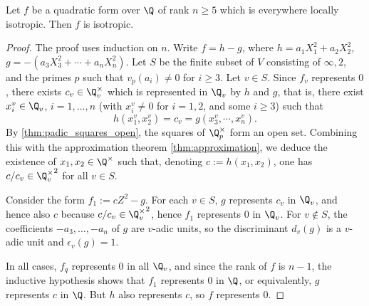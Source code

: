 \begin{lemma}\label{lem:isotr_of_five_le_rk}
\leanok
Let $f$ be a quadratic form over $\Q$ of rank $n \ge 5$ which is everywhere locally isotropic. Then $f$ is isotropic.
\end{lemma}
\begin{proof}
The proof uses induction on $n$. Write $f = h - g$, where $h = a_1X_1^2 + a_2X_2^2$, $g = -(a_3X_3^2 + \cdots + a_nX_n^2)$.
Let $S$ be the finite subset of $V$ consisting of $\infty, 2$, and the primes $p$ such that $v_p(a_i) \ne 0$ for $i \ge 3$.
Let $v \in S$. Since $f_v$ represents $0$, there exists $c_v \in \Q_v^\times$ which is represented in $\Q_v$ by $h$ and $g$, that is, there exist $x_i^v \in \Q_v$, $i=1, \dots, n$ (with $x_i^v \ne 0$ for $i=1, 2$, and some $i \ge 3$) such that 
\[ h(x_1^v, x_2^v) = c_v = g(x_3^v, \cdots, x_n^v).\]
By \ref{thm:padic_squares_open}, the squares of $\Q_p^\times$ form an open set. Combining this with the approximation theorem \ref{thm:approximation}, we deduce the existence of $x_1, x_2 \in \Q^\times$ such that, denoting $c := h(x_1, x_2)$, one has $c/c_v \in {\Q_v^\times}^2$ for all $v \in S$.

Consider the form $f_1 := cZ^2 - g$. For each $v \in S$, $g$ represents $c_v$ in $\Q_v$, and hence also $c$ because $c/c_v \in {\Q_v^\times}^2$, hence $f_1$ represents $0$ in $\Q_v$. For $v \notin S$, the coefficients $-a_3, \dots, -a_n$ of $g$ are $v$-adic units, so the discriminant $d_v(g)$ is a $v$-adic unit and $\epsilon_v(g)=1$.

In all cases, $f_q$ represents $0$ in all $\Q_v$, and since the rank of $f$ is $n-1$, the inductive hypothesis shows that $f_1$ represents $0$ in $\Q$, or equivalently, $g$ represents $c$ in $\Q$. But $h$ also represents $c$, so $f$ represents $0$.

\end{proof}